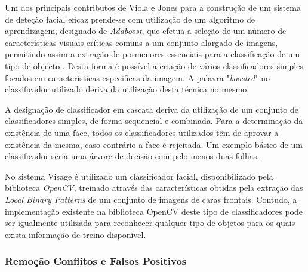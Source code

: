 Um dos principais contributos de Viola e Jones para a construção de um sistema de deteção facial eficaz prende-se com utilização de um algoritmo de aprendizagem, designado de \textit{Adaboost}, que efetua a seleção de um número de características visuais críticas comuns a um conjunto alargado de imagens, permitindo assim a extração de pormenores essenciais para a classificação de um tipo de objecto \cite{Viola2001}. Desta forma é possível a criação de vários classificadores simples focados em características especificas da imagem. A palavra "\textit{boosted}" no classificador utilizado deriva da utilização desta técnica no mesmo.
 
A designação de classificador em cascata deriva da utilização de um conjunto de classificadores simples, de forma sequencial e combinada. Para a determinação da existência de uma face, todos os classificadores utilizados  têm de aprovar a existência da mesma, caso contrário a face é rejeitada. Um exemplo básico de um classificador seria uma árvore de decisão com pelo menos duas folhas.

No sistema Visage é utilizado um classificador facial, disponibilizado pela biblioteca \textit{OpenCV}, treinado através das características obtidas pela extração das \textit{Local Binary Patterns} \cite{Ahonen2006} de um conjunto de imagens de caras frontais. Contudo, a implementação existente na biblioteca OpenCV deste tipo de classificadores pode ser igualmente utilizada para reconhecer qualquer tipo de objetos para os quais exista informação de treino disponível.

\subsubsection*{Remoção Conflitos e Falsos Positivos}

